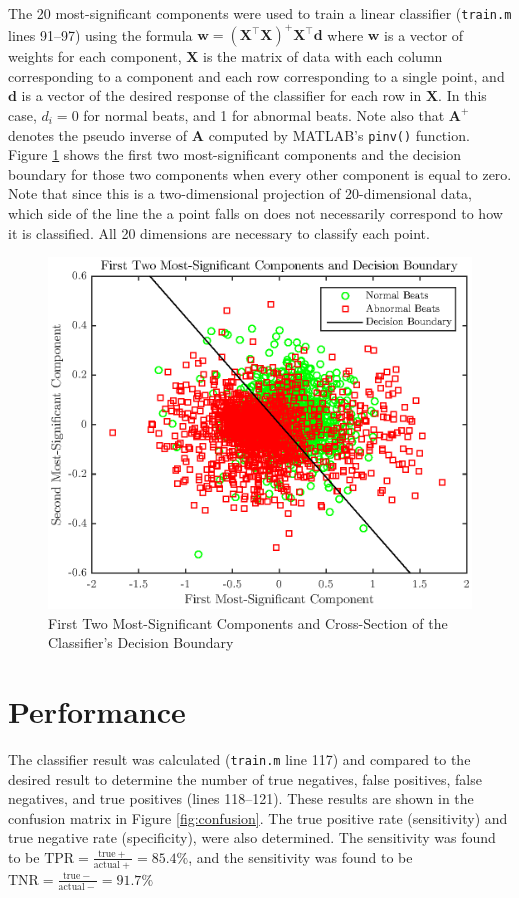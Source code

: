 \documentclass[12pt,letter]{article}
\begin{document}
The 20 most-significant components were used to train a linear classifier
(\verb`train.m` lines 91--97) using the formula $\mathbf{w} = (\mathbf{X}^\top
\mathbf{X})^+ \mathbf{X}^\top \mathbf{d}$ where $\mathbf{w}$ is a vector of
weights for each component, $\mathbf{X}$ is the matrix of data with each column
corresponding to a component and each row corresponding to a single point, and
$\mathbf{d}$ is a vector of the desired response of the classifier for each row
in $\mathbf{X}$.  In this case, $d_i = 0$ for normal beats, and 1 for abnormal
beats.  Note also that $\mathbf{A}^+$ denotes the pseudo inverse of $\mathbf{A}$
computed by MATLAB's \verb`pinv()` function.  Figure \ref{fig:classifier} shows
the first two most-significant components and the decision boundary for those
two components when every other component is equal to zero.  Note that since
this is a two-dimensional projection of 20-dimensional data, which side of the
line the a point falls on does not necessarily correspond to how it is
classified.  All 20 dimensions are necessary to classify each point.  

\begin{figure}[hbtp]
    \centering
    \includegraphics[height=0.42\textheight]{../figures/train_05}
    \caption{First Two Most-Significant Components and Cross-Section of the
    Classifier's Decision Boundary}
    \label{fig:classifier}
\end{figure}

\section{Performance} 
The classifier result was calculated (\verb`train.m` line 117) and compared to
the desired result to determine the number of true negatives, false positives,
false negatives, and true positives (lines 118--121).  These results are shown
in the confusion matrix in Figure \ref{fig:confusion}. The true positive rate
(sensitivity) and true negative rate (specificity), were also determined.  The
sensitivity was found to be $\mathrm{TPR} = \frac{\mathrm{true}
+}{\mathrm{actual} +} = 85.4\%$, and the sensitivity was found to be
$\mathrm{TNR} = \frac{\mathrm{true} -}{\mathrm{actual} -} = 91.7\%$
\end{document}

